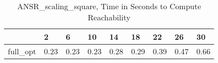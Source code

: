 \begin{table}
\caption{ANSR\_scaling\_square, Time in Seconds to Compute Reachability}
\label{ANSR_scaling_square_states_time}
\begin{tabular}{lllllllll}
\toprule
 & 2 & 6 & 10 & 14 & 18 & 22 & 26 & 30 \\
\midrule
full\_opt & 0.23 & 0.23 & 0.23 & 0.28 & 0.29 & 0.39 & 0.47 & 0.66 \\
\bottomrule
\end{tabular}
\end{table}
